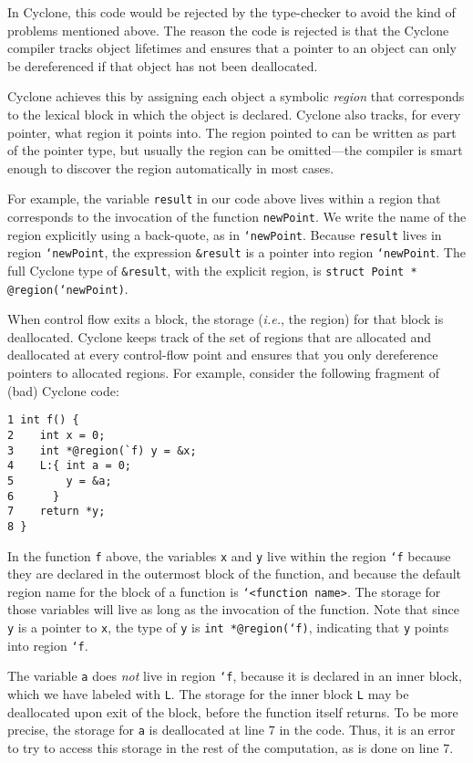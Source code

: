 In Cyclone, this code would be rejected by the type-checker to avoid
the kind of problems mentioned above.  The reason the code is rejected
is that the Cyclone compiler tracks object lifetimes and ensures that
a pointer to an object can only be dereferenced if that object 
has not been deallocated.  

Cyclone achieves this by assigning each object a symbolic
\emph{region} that corresponds to the lexical block in which the
object is declared.  Cyclone also tracks, for every pointer, what
region it points into.  The region pointed to can be written as part
of the pointer type, but usually the region can be omitted---the
compiler is smart enough to discover the region automatically in most
cases.

For example, the variable \texttt{result} in our code above lives
within a region that corresponds to the invocation of the function
\texttt{newPoint}.  We write the name of the region explicitly using a
back-quote, as in \texttt{`newPoint}.  Because \texttt{result} lives
in region \texttt{`newPoint}, the expression \texttt{\&result} is a
pointer into region \texttt{`newPoint}.  The full Cyclone type of
\texttt{\&result}, with the explicit region, is \texttt{struct Point
* @region(`newPoint)}.

When control flow exits a block, the storage (\emph{i.e.}, 
the region) for that 
block is deallocated.  Cyclone keeps track of the set of regions that
are allocated and deallocated at every control-flow point and ensures
that you only dereference pointers to allocated regions.  For example,
consider the following fragment of (bad) Cyclone code:
\begin{verbatim}
1 int f() {
2    int x = 0;
3    int *@region(`f) y = &x;
4    L:{ int a = 0;
5        y = &a;
6      }
7    return *y;
8 }
\end{verbatim}
In the function \texttt{f} above, the variables \texttt{x} and 
\texttt{y} live within the region \texttt{`f} because they are
declared in the outermost block of the function, and because
the default region name for the block of a function is
\texttt{`<function name>}.  
The storage for
those variables will live as long as the invocation of the function.
Note that since \texttt{y} is a pointer to \texttt{x}, the type of
\texttt{y} is \texttt{int *@region(`f)}, indicating that \texttt{y} 
points into region \texttt{`f}.

The variable \texttt{a} does \emph{not} live in region \texttt{`f},
because it is declared in an inner block, which we have labeled with
\texttt{L}.  The storage for the inner block \texttt{L} may be
deallocated upon exit of the block, before the function itself
returns.  To be more precise, the storage for \texttt{a} is
deallocated at line 7 in the code.  Thus, it is an error to try to
access this storage in the rest of the computation, as is done on line
7.


